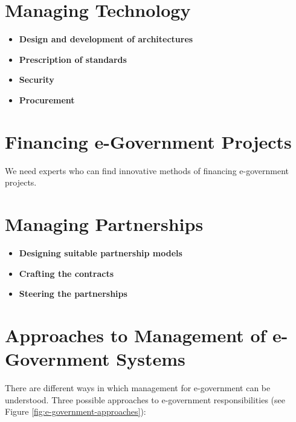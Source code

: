 \section*{Managing Technology}
\begin{itemize}
	\item \textbf{Design and development of architectures}
	\item \textbf{Prescription of standards}
	\item \textbf{Security}
	\item \textbf{Procurement}
\end{itemize}

\section*{Financing e-Government Projects}
We need experts who can find innovative methods of financing e-government projects.

\section*{Managing Partnerships}
\begin{itemize}
	\item \textbf{Designing suitable partnership models}
	\item \textbf{Crafting the contracts}
	\item \textbf{Steering the partnerships}
\end{itemize}

 \section{Approaches to Management of e-Government Systems}
There are different ways in which management for e-government can be understood. Three possible approaches to e-government responsibilities (see Figure \ref{fig:e-government-approaches}):


